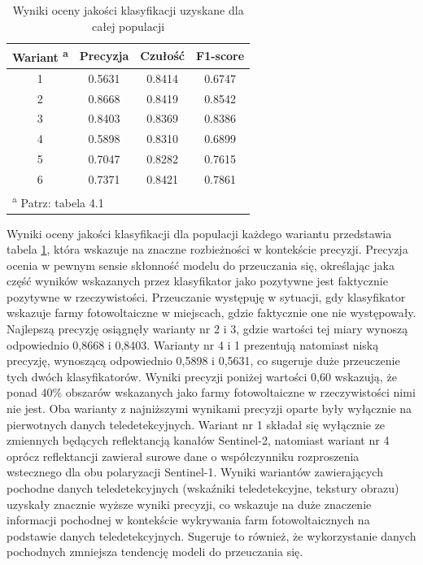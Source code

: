 \documentclass{amuthesis}
\begin{document}
\hypertarget{tbl-tabela-population-quality-assessment}{}
\begin{table}
\caption{\label{tbl-tabela-population-quality-assessment}Wyniki oceny jakości klasyfikacji uzyskane dla całej populacji }\tabularnewline

\centering
\begin{tabular}{cccc}
\toprule
Wariant \textsuperscript{a} & Precyzja & Czułość & F1-score\\
\midrule
1 & 0.5631 & 0.8414 & 0.6747\\
2 & 0.8668 & 0.8419 & 0.8542\\
3 & 0.8403 & 0.8369 & 0.8386\\
4 & 0.5898 & 0.8310 & 0.6899\\
5 & 0.7047 & 0.8282 & 0.7615\\
6 & 0.7371 & 0.8421 & 0.7861\\
\bottomrule
\multicolumn{4}{l}{\textsuperscript{a} Patrz: tabela 4.1}\\
\end{tabular}
\end{table}

Wyniki oceny jakości klasyfikacji dla populacji każdego wariantu
przedstawia tabela \ref{tbl-tabela-population-quality-assessment}, która
wskazuje na znaczne rozbieżności w kontekście precyzji. Precyzja ocenia
w pewnym sensie skłonność modelu do przeuczania się, określając jaka
część wyników wskazanych przez klasyfikator jako pozytywne jest
faktycznie pozytywne w rzeczywistości. Przeuczanie występuję w sytuacji,
gdy klasyfikator wskazuje farmy fotowoltaiczne w miejscach, gdzie
faktycznie one nie występowały. Najlepszą precyzję osiągnęły warianty nr
2 i 3, gdzie wartości tej miary wynoszą odpowiednio 0,8668 i 0,8403.
Warianty nr 4 i 1 prezentują natomiast niską precyzję, wynoszącą
odpowiednio 0,5898 i 0,5631, co sugeruje duże przeuczenie tych dwóch
klasyfikatorów. Wyniki precyzji poniżej wartości 0,60 wskazują, że ponad
40\% obszarów wskazanych jako farmy fotowoltaiczne w rzeczywistości nimi
nie jest. Oba warianty z najniższymi wynikami precyzji oparte były
wyłącznie na pierwotnych danych teledetekcyjnych. Wariant nr 1 składał
się wyłącznie ze zmiennych będących reflektancją kanałów Sentinel-2,
natomiast wariant nr 4 oprócz reflektancji zawierał surowe dane o
współczynniku rozproszenia wstecznego dla obu polaryzacji Sentinel-1.
Wyniki wariantów zawierających pochodne danych teledetekcyjnych
(wskaźniki teledetekcyjne, tekstury obrazu) uzyskały znacznie wyższe
wyniki precyzji, co wskazuje na duże znaczenie informacji pochodnej w
kontekście wykrywania farm fotowoltaicznych na podstawie danych
teledetekcyjnych. Sugeruje to również, że wykorzystanie danych
pochodnych zmniejsza tendencję modeli do przeuczania się.
\end{document}
